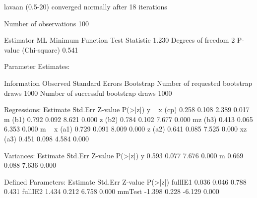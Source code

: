 \begin{Schunk}
\begin{Soutput}
lavaan (0.5-20) converged normally after  18 iterations

  Number of observations                           100

  Estimator                                         ML
  Minimum Function Test Statistic                1.230
  Degrees of freedom                                 2
  P-value (Chi-square)                           0.541

Parameter Estimates:

  Information                                 Observed
  Standard Errors                            Bootstrap
  Number of requested bootstrap draws             1000
  Number of successful bootstrap draws            1000

Regressions:
                   Estimate  Std.Err  Z-value  P(>|z|)
  y ~                                                 
    x         (cp)    0.258    0.108    2.389    0.017
    m         (b1)    0.792    0.092    8.621    0.000
    z         (b2)    0.784    0.102    7.677    0.000
    mz        (b3)    0.413    0.065    6.353    0.000
  m ~                                                 
    x         (a1)    0.729    0.091    8.009    0.000
    z         (a2)    0.641    0.085    7.525    0.000
    xz        (a3)    0.451    0.098    4.584    0.000

Variances:
                   Estimate  Std.Err  Z-value  P(>|z|)
    y                 0.593    0.077    7.676    0.000
    m                 0.669    0.088    7.636    0.000

Defined Parameters:
                   Estimate  Std.Err  Z-value  P(>|z|)
    fullIE1           0.036    0.046    0.788    0.431
    fullIE2           1.434    0.212    6.758    0.000
    mmTest           -1.398    0.228   -6.129    0.000
\end{Soutput}
\end{Schunk}

